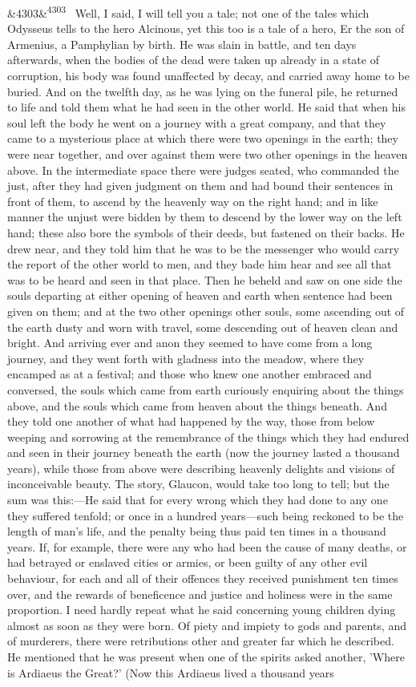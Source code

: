 \documentclass[12pt]{article}
\newcommand{\para}[1][]{\par\noindent\ifx&#1&\else\textsuperscript{\footnotesize #1}~\fi}
\begin{document}
\para[4303] Well, I said, I will tell you a tale; not one of the tales which Odysseus tells to the hero Alcinous, yet this too is a tale of a hero, Er the son of Armenius, a Pamphylian by birth. He was slain in battle, and ten days afterwards, when the bodies of the dead were taken up already in a state of corruption, his body was found unaffected by decay, and carried away home to be buried. And on the twelfth day, as he was lying on the funeral pile, he returned to life and told them what he had seen in the other world. He said that when his soul left the body he went on a journey with a great company, and that they came to a mysterious place at which there were two openings in the earth; they were near together, and over against them were two other openings in the heaven above. In the intermediate space there were judges seated, who commanded the just, after they had given judgment on them and had bound their sentences in front of them, to ascend by the heavenly way on the right hand; and in like manner the unjust were bidden by them to descend by the lower way on the left hand; these also bore the symbols of their deeds, but fastened on their backs. He drew near, and they told him that he was to be the messenger who would carry the report of the other world to men, and they bade him hear and see all that was to be heard and seen in that place. Then he beheld and saw on one side the souls departing at either opening of heaven and earth when sentence had been given on them; and at the two other openings other souls, some ascending out of the earth dusty and worn with travel, some descending out of heaven clean and bright. And arriving ever and anon they seemed to have come from a long journey, and they went forth with gladness into the meadow, where they encamped as at a festival; and those who knew one another embraced and conversed, the souls which came from earth curiously enquiring about the things above, and the souls which came from heaven about the things beneath. And they told one another of what had happened by the way, those from below weeping and sorrowing at the remembrance of the things which they had endured and seen in their journey beneath the earth (now the journey lasted a thousand years), while those from above were describing heavenly delights and visions of inconceivable beauty. The story, Glaucon, would take too long to tell; but the sum was this:---He said that for every wrong which they had done to any one they suffered tenfold; or once in a hundred years---such being reckoned to be the length of man's life, and the penalty being thus paid ten times in a thousand years. If, for example, there were any who had been the cause of many deaths, or had betrayed or enslaved cities or armies, or been guilty of any other evil behaviour, for each and all of their offences they received punishment ten times over, and the rewards of beneficence and justice and holiness were in the same proportion. I need hardly repeat what he said concerning young children dying almost as soon as they were born. Of piety and impiety to gods and parents, and of murderers, there were retributions other and greater far which he described. He mentioned that he was present when one of the spirits asked another, 'Where is Ardiaeus the Great?' (Now this Ardiaeus lived a thousand years 
\end{document}
